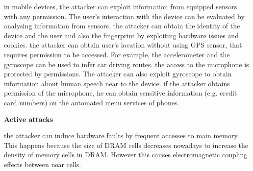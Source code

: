 \begin{itemize}
{in mobile devices, the attacker can exploit information from equipped sensors with any permission. The user's interaction with the device can be evaluated by analysing information from sensors.}
{the attacker can obtain the identity of the device and the user and also the fingerprint by exploiting hardware issues and cookies.}
{the attacker can obtain user's location without using GPS sensor, that requires permission to be accessed. For example, the accelerometer and the gyroscope can be used to infer car driving routes.}
{the access to the microphone is protected by permissions. The attacker can also exploit gyroscope to obtain information about human speech near to the device.}
{if the attacker obtains permission of the microphone, he can obtain sensitive information (e.g. credit card numbers) on the automated menu services of phones.}
\end{itemize}
\vspace{2cm}
\textbf{Active attacks}
\begin{itemize}
{the attacker can induce hardware faults by frequent accesses to main memory. This happens because the size of DRAM cells decreases nowadays to increase the density of memory cells in DRAM. However this causes electromagnetic coupling effects between near cells.}
\end{itemize}

